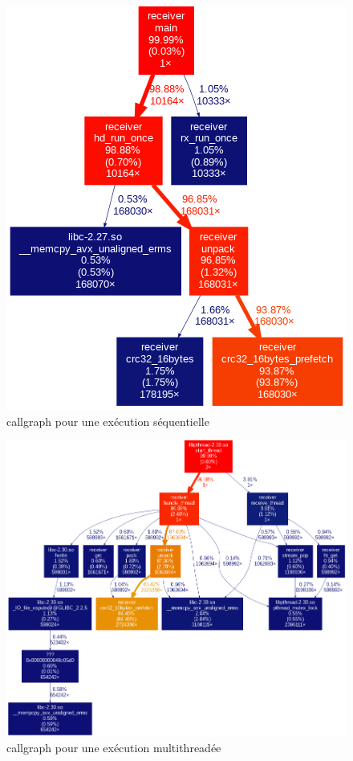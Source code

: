 \documentclass[../main.tex]{subfiles}
\begin{document}
\newpage
\begin{figure}
    \includegraphics[scale=0.6]{assets/callgraph_seq.png}
    \caption{callgraph pour une exécution séquentielle}
\end{figure}

\newpage
\begin{figure}
    \includegraphics[scale=1.2]{assets/callgraph.png}
    \caption{callgraph pour une exécution multithreadée}
\end{figure}
\end{document}
